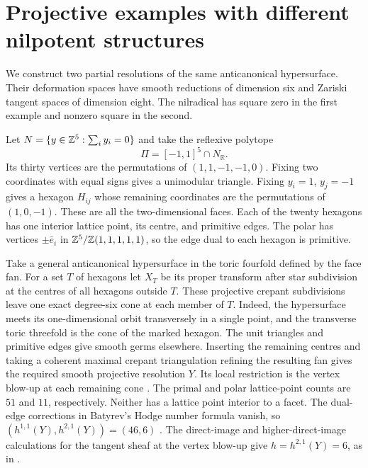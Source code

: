 \section{Projective examples with different nilpotent structures}
\label{sec:examples}

We construct two partial resolutions of the same anticanonical
hypersurface. Their deformation spaces have smooth reductions of
dimension six and Zariski tangent spaces of dimension eight. The
nilradical has square zero in the first example and nonzero square in
the second.

Let $N=\{y\in\mathbb Z^5:\sum_i y_i=0\}$ and take the reflexive polytope
\[
  \Pi=[-1,1]^5\cap N_{\mathbb R}.
\]
Its thirty vertices are the permutations of $(1,1,-1,-1,0)$.
Fixing two coordinates with equal signs gives a unimodular triangle.
Fixing $y_i=1$, $y_j=-1$ gives a hexagon $H_{ij}$ whose remaining
coordinates are the permutations of $(1,0,-1)$. These are all the
two-dimensional faces. Each of the twenty hexagons has one interior
lattice point, its centre, and primitive edges. The polar has vertices
$\pm\bar e_i$ in $\mathbb Z^5/\mathbb Z(1,1,1,1,1)$, so the edge dual to each
hexagon is primitive.

Take a general anticanonical hypersurface in the toric fourfold
defined by the face fan. For a set $T$ of hexagons let $X_T$ be its
proper transform after star subdivision at the centres of all hexagons
outside $T$. These projective crepant subdivisions leave one exact
degree-six cone at each member of $T$. Indeed, the hypersurface meets
its one-dimensional orbit transversely in a single point, and the
transverse toric threefold is the cone of the marked hexagon. The unit
triangles and primitive edges give smooth germs elsewhere. Inserting
the remaining centres and taking a coherent maximal crepant
triangulation refining the resulting fan gives the required smooth
projective resolution $Y$. Its local restriction is the vertex blow-up
at each remaining cone \cite[\S8.1]{W4}.
The primal and polar lattice-point counts are $51$ and $11$,
respectively. Neither has a lattice point interior to a facet.
The dual-edge corrections in Batyrev's Hodge number formula vanish,
so $(h^{1,1}(Y),h^{2,1}(Y))=(46,6)$
\cite[Corollary~4.5.1]{Batyrev}.
The direct-image and higher-direct-image calculations for the tangent
sheaf at the vertex blow-up give $h=h^{2,1}(Y)=6$,
as in \cite[proof of Lemma~5.2]{W5}.

